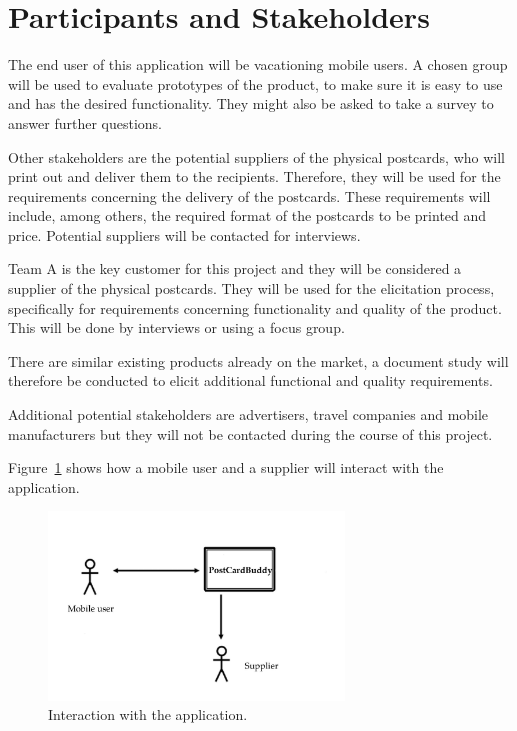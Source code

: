 \documentclass[10pt,a4paper]{article}
\begin{document}
\section{Participants and Stakeholders}
The end user of this application will be vacationing mobile users. A chosen group will be used to evaluate prototypes of the product, to make sure it is easy to use and has the desired functionality. They might also be asked to take a survey to answer further questions.

Other stakeholders are the potential suppliers of the physical postcards, who will print out and deliver them to the recipients. Therefore, they will be used for the requirements concerning the delivery of the postcards. These requirements will include, among others, the required format of the postcards to be printed and price. Potential suppliers will be contacted for interviews.

Team A is the key customer for this project and they will be considered a supplier of the physical postcards. They will be used for the elicitation process, specifically for requirements concerning functionality and quality of the product. This will be done by interviews or using a focus group. 

There are similar existing products already on the market, a document study will therefore be conducted to elicit additional functional and quality requirements. 

Additional potential stakeholders are advertisers, travel companies and mobile manufacturers but they will not be contacted during the course of this project.

Figure~\ref{fig:stake} shows how a mobile user and a supplier will interact with the application. 

\begin{figure}[h!]
\centering
\includegraphics[width=0.7\textwidth]{im.jpg}
\caption{Interaction with the application.}
\label{fig:stake}
\end{figure}
\end{document}
